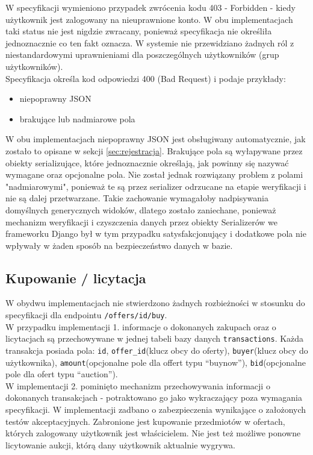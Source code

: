 \documentclass[12pt, notitlepage]{article}
\begin{document}
W specyfikacji wymieniono przypadek zwrócenia kodu 403 - Forbidden - kiedy użytkownik jest zalogowany na nieuprawnione konto. W obu implementacjach taki status nie jest nigdzie zwracany, ponieważ specyfikacja nie określiła jednoznacznie co ten fakt oznacza. W systemie nie przewidziano żadnych ról z niestandardowymi uprawnieniami dla poszczególnych użytkowników (grup użytkowników).\\

Specyfikacja określa kod odpowiedzi 400 (Bad Request) i podaje przykłady:
\begin{itemize}
    \item niepoprawny JSON
    \item brakujące lub nadmiarowe pola
\end{itemize}
W obu implementacjach niepoprawny JSON jest obsługiwany automatycznie, jak zostało to opisane w sekcji \ref{sec:rejestracja}. Brakujące pola są wyłapywane przez obiekty serializujące, które jednoznacznie określają, jak powinny się nazywać wymagane oraz opcjonalne pola. Nie został jednak rozwiązany problem z polami "nadmiarowymi", ponieważ te są przez serializer odrzucane na etapie weryfikacji i nie są dalej przetwarzane. Takie zachowanie wymagałoby nadpisywania domyślnych generycznych widoków, dlatego zostało zaniechane, ponieważ mechanizm weryfikacji i czyszczenia danych przez obiekty Serializerów we frameworku Django był w tym przypadku satysfakcjonujący i dodatkowe pola nie wpływały w żaden sposób na bezpieczeństwo danych w bazie.

\subsection{Kupowanie / licytacja}

W obydwu implementacjach nie stwierdzono żadnych rozbieżności w stosunku do specyfikacji dla endpointu \texttt{/offers/{id}/buy}. \\
W przypadku implementacji 1. informacje o dokonanych zakupach oraz o licytacjach są przechowywane w jednej tabeli bazy danych \texttt{transactions}. Każda transakcja posiada pola: \texttt{id}, \texttt{offer\_id}(klucz obcy do oferty), \texttt{buyer}(klucz obcy do użytkownika), \texttt{amount}(opcjonalne pole dla offert typu ``buynow''), \texttt{bid}(opcjonalne pole dla ofert typu ``auction'').  \\
W implementacji 2. pominięto mechanizm przechowywania informacji o dokonanych transakcjach - potraktowano go jako wykraczający poza wymagania specyfikacji. W implementacji zadbano o zabezpieczenia wynikające o założonych testów akceptacyjnych. Zabronione jest kupowanie przedmiotów w ofertach, których zalogowany użytkownik jest właścicielem. Nie jest też możliwe ponowne licytowanie aukcji, którą dany użytkownik aktualnie wygrywa.
\end{document}
